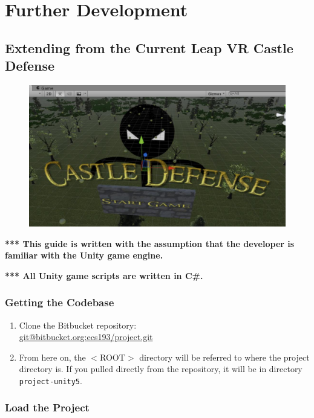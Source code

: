 \documentclass[a4paper]{refart}
\begin{document}
\newpage

\section{Further Development}

\subsection{Extending from the Current Leap VR Castle Defense}

\begin{figure}[h]
	\centering
	\includegraphics[width=\textwidth]{scene.jpg}
\end{figure}


\textbf{*** This guide is written with the assumption that the developer is familiar with the Unity game engine.}

\textbf{*** All Unity game scripts are written in C\#.}

\subsubsection{Getting the Codebase}

\begin{enumerate}
	\item Clone the Bitbucket repository:\\ \url{git@bitbucket.org:ecs193/project.git}
	\item From here on, the $<$ROOT$>$ directory will be referred to where the project directory is. If you pulled directly from the repository, it will be in directory \texttt{project-unity5}.
\end{enumerate}

\subsubsection{Load the Project}
\end{document}
